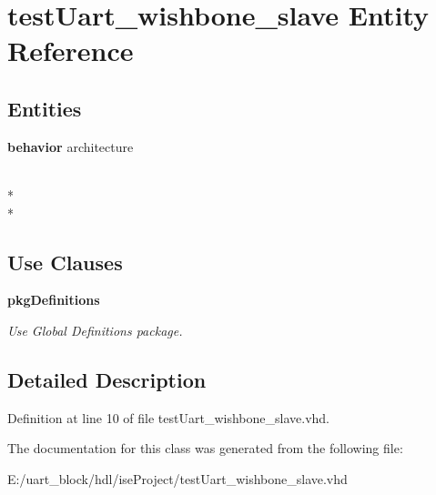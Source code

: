 \section{test\-Uart\-\_\-wishbone\-\_\-slave Entity Reference}
\label{classtest_uart__wishbone__slave}
\subsection*{Entities}
\begin{DoxyCompactItemize}
\item 
{\bf behavior} architecture
\end{DoxyCompactItemize}
\\*
\\*
\subsection*{Use Clauses}
 \begin{DoxyCompactItemize}
\item 
{\bf pkg\-Definitions}   \label{classtest_uart__wishbone__slave_ac442dca664056131bdaf5c92e4351e01}

\begin{DoxyCompactList}\small\item\em Use Global Definitions package. \end{DoxyCompactList}\end{DoxyCompactItemize}


\subsection{Detailed Description}


Definition at line 10 of file test\-Uart\-\_\-wishbone\-\_\-slave.\-vhd.



The documentation for this class was generated from the following file\-:\begin{DoxyCompactItemize}
\item 
E\-:/uart\-\_\-block/hdl/ise\-Project/test\-Uart\-\_\-wishbone\-\_\-slave.\-vhd\end{DoxyCompactItemize}
